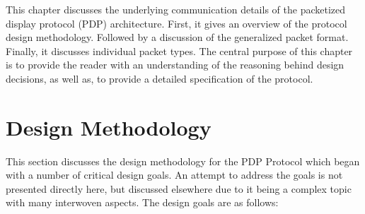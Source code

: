 \label{chap:pdp_protocol}

This chapter discusses the underlying communication details of the packetized display protocol (PDP) architecture. First, it gives an overview of the protocol design methodology. Followed by a discussion of the generalized packet format. Finally, it discusses individual packet types. The central purpose of this chapter is to provide the reader with an understanding of the reasoning behind design decisions, as well as, to provide a detailed specification of the protocol.

\section{Design Methodology}
    \label{sec:design_methodology}
    This section discusses the design methodology for the PDP Protocol which began with a number of critical design goals. An attempt to address the goals is not presented directly here, but discussed  elsewhere due to it being a complex topic with many interwoven aspects. The design goals are as follows:

